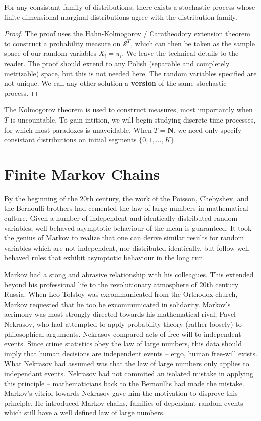 \begin{theorem}
    For any consistant family of distributions, there exists a stochastic process whose finite dimensional marginal distributions agree with the distribution family.
\end{theorem}
\begin{proof}
    The proof uses the Hahn-Kolmogorov / Carath\"{e}odory extension theorem to construct a probability measure on $\mathcal{S}^T$, which can then be taken as the sample space of our random variables $X_i = \pi_i$. We leave the technical details to the reader. The proof should extend to any Polish (separable and completely metrizable) space, but this is not needed here. The random variables specified are not unique. We call any other solution a {\bf version} of the same stochastic process.
\end{proof}

The Kolmogorov theorem is used to construct measures, most importantly when $T$ is uncountable. To gain intition, we will begin studying discrete time processes, for which most paradoxes is unavoidable. When $T = \mathbf{N}$, we need only specify consistant distributions on initial segments $\{ 0, 1, \dots, K \}$.

\chapter{Finite Markov Chains}

By the beginning of the 20th century, the work of the Poisson, Chebyshev, and the Bernoulli brothers had cemented the law of large numbers in mathematical culture. Given a number of independent and identically distributed random variables, well behaved asymptotic behaviour of the mean is guaranteed. It took the genius of Markov to realize that one can derive similar results for random variables which are not independent, nor distributed identically, but follow well behaved rules that exhibit asymptotic behaviour in the long run.

Markov had a stong and abrasive relationship with his colleagues. This extended beyond his professional life to the revolutionary atmosphere of 20th century Russia. When Leo Tolstoy was excommunicated from the Orthodox church, Markov requested that he too be excommunicated in solidarity. Markov's acrimony was most strongly directed towards his mathematical rival, Pavel Nekrasov, who had attempted to apply probability theory (rather loosely) to philosophical arguments. Nekrasov compared acts of free will to independent events. Since crime statistics obey the law of large numbers, this data should imply that human decisions are independent events -- ergo, human free-will exists. What Nekrasov had assumed was that the law of large numbers only applies to independant events. Nekrasov had not commited an isolated mistake in applying this principle -- mathematicians back to the Bernoullis had made the mistake. Markov's vitriol towards Nekrasov gave him the motivation to disprove this principle. He introduced Markov chains, families of dependant random events which still have a well defined law of large numbers.

